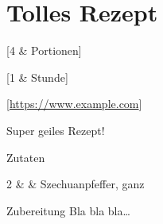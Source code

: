 \section{Tolles Rezept}\label{rcp:tolles-rezept}


\begin{recipeintro}
  [4 & Portionen]
  
  [1 & Stunde]
  
  [\url{https://www.example.com}]
  
  Super geiles Rezept!
\end{recipeintro}

\begin{ingredients}
  {Zutaten}
  
  2                &  \si{\tl}           &  Szechuanpfeffer, ganz  \\
  
  
\end{ingredients}

\vspace{0.5cm}

\begin{recipestep}
  {Zubereitung}
  Bla bla bla\ldots
\end{recipestep}
